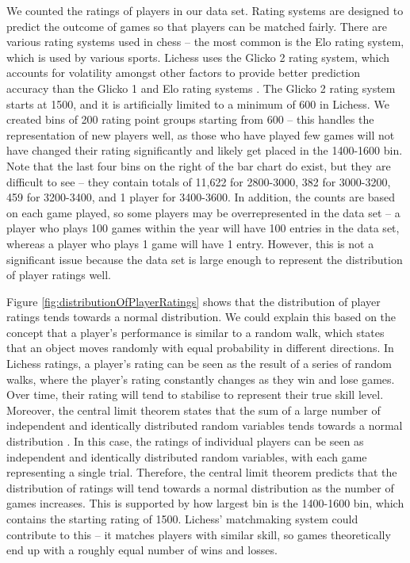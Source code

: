 \documentclass[a4paper, 11pt]{article}
\begin{document}
We counted the ratings of players in our data set. Rating systems are designed to predict the outcome of games so that players can be matched fairly. There are various rating systems used in chess -- the most common is the Elo rating system, which is used by various sports. Lichess uses the Glicko 2 rating system, which accounts for volatility amongst other factors to provide better prediction accuracy than the Glicko 1 and Elo rating systems \cite{chessRatingSystems, DeloitteFIDEChessRatingChallenge}. The Glicko 2 rating system starts at 1500, and it is artificially limited to a minimum of 600 in Lichess. We created bins of 200 rating point groups starting from 600 -- this handles the representation of new players well, as those who have played few games will not have changed their rating significantly and likely get placed in the 1400-1600 bin. Note that the last four bins on the right of the bar chart do exist, but they are difficult to see -- they contain totals of 11,622 for 2800-3000, 382 for 3000-3200, 459 for 3200-3400, and 1 player for 3400-3600. In addition, the counts are based on each game played, so some players may be overrepresented in the data set -- a player who plays 100 games within the year will have 100 entries in the data set, whereas a player who plays 1 game will have 1 entry. However, this is not a significant issue because the data set is large enough to represent the distribution of player ratings well.

Figure \ref{fig:distributionOfPlayerRatings} shows that the distribution of player ratings tends towards a normal distribution. We could explain this based on the concept that a player's performance is similar to a random walk, which states that an object moves randomly with equal probability in different directions. In Lichess ratings, a player's rating can be seen as the result of a series of random walks, where the player's rating constantly changes as they win and lose games. Over time, their rating will tend to stabilise to represent their true skill level. Moreover, the central limit theorem states that the sum of a large number of independent and identically distributed random variables tends towards a normal distribution \cite{le1986central}. In this case, the ratings of individual players can be seen as independent and identically distributed random variables, with each game representing a single trial. Therefore, the central limit theorem predicts that the distribution of ratings will tend towards a normal distribution as the number of games increases. This is supported by how largest bin is the 1400-1600 bin, which contains the starting rating of 1500. Lichess' matchmaking system could contribute to this -- it matches players with similar skill, so games theoretically end up with a roughly equal number of wins and losses.
\end{document}
